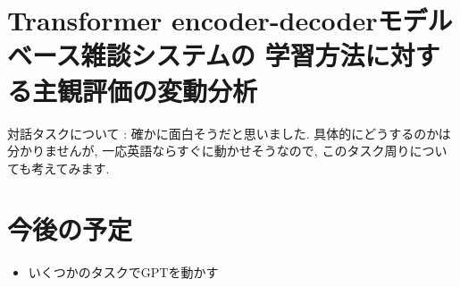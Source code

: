 \documentclass[twocolumn]{jarticle}     %
\begin{document}
\section{Transformer encoder-decoderモデルベース雑談システムの
学習方法に対する主観評価の変動分析}
対話タスクについて : 確かに面白そうだと思いました.
具体的にどうするのかは分かりませんが,
一応英語ならすぐに動かせそうなので, このタスク周りについても考えてみます.

\section{今後の予定}
\begin{itemize}
  \item いくつかのタスクでGPTを動かす
\end{itemize}



\end{document}
